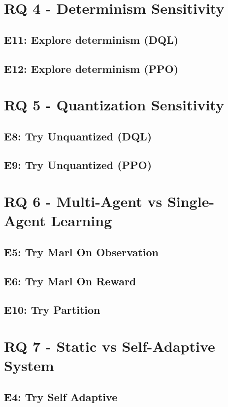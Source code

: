 \section{RQ 4 - Determinism Sensitivity}
  \subsection{E11: Explore determinism (DQL)}
  \subsection{E12: Explore determinism (PPO)}

\section{RQ 5 - Quantization Sensitivity}
  \subsection{E8: Try Unquantized (DQL)}
  \subsection{E9: Try Unquantized (PPO)}

\section{RQ 6 - Multi-Agent vs Single-Agent Learning}
  \subsection{E5: Try Marl On Observation}
  \subsection{E6: Try Marl On Reward}
  \subsection{E10: Try Partition}

\section{RQ 7 - Static vs Self-Adaptive System}
  \subsection{E4: Try Self Adaptive}

